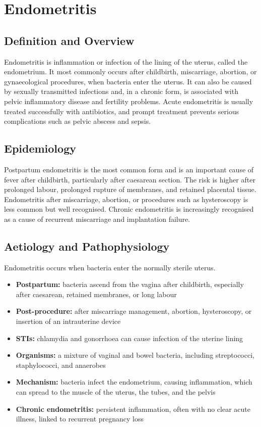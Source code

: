 \chapter{Endometritis}

\section*{Definition and Overview}
Endometritis is inflammation or infection of the lining of the uterus, called the endometrium. It most commonly occurs after childbirth, miscarriage, abortion, or gynaecological procedures, when bacteria enter the uterus. It can also be caused by sexually transmitted infections and, in a chronic form, is associated with pelvic inflammatory disease and fertility problems. Acute endometritis is usually treated successfully with antibiotics, and prompt treatment prevents serious complications such as pelvic abscess and sepsis.

\section*{Epidemiology}
Postpartum endometritis is the most common form and is an important cause of fever after childbirth, particularly after caesarean section. The risk is higher after prolonged labour, prolonged rupture of membranes, and retained placental tissue. Endometritis after miscarriage, abortion, or procedures such as hysteroscopy is less common but well recognised. Chronic endometritis is increasingly recognised as a cause of recurrent miscarriage and implantation failure.

\section*{Aetiology and Pathophysiology}
Endometritis occurs when bacteria enter the normally sterile uterus.
\begin{itemize}
    \item \textbf{Postpartum:} bacteria ascend from the vagina after childbirth, especially after caesarean, retained membranes, or long labour
    \item \textbf{Post-procedure:} after miscarriage management, abortion, hysteroscopy, or insertion of an intrauterine device
    \item \textbf{STIs:} chlamydia and gonorrhoea can cause infection of the uterine lining
    \item \textbf{Organisms:} a mixture of vaginal and bowel bacteria, including streptococci, staphylococci, and anaerobes
    \item \textbf{Mechanism:} bacteria infect the endometrium, causing inflammation, which can spread to the muscle of the uterus, the tubes, and the pelvis
    \item \textbf{Chronic endometritis:} persistent inflammation, often with no clear acute illness, linked to recurrent pregnancy loss
\end{itemize}

